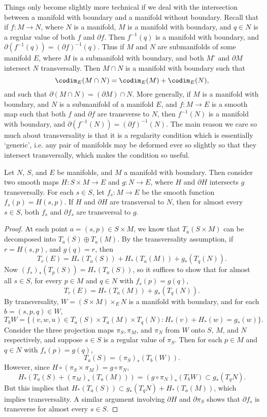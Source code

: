 Things only become slightly more technical if we deal with the intersection between a manifold with boundary and a manifold without boundary. Recall that if $f: M \to N$, where $N$ is a manifold, $M$ is a manifold with boundary, and $q \in N$ is a regular value of both $f$ and $\partial f$. Then $f^{-1}(q)$ is a manifold with boundary, and $\partial (f^{-1}(q)) = (\partial f)^{-1}(q)$. Thus if $M$ and $N$ are submanifolds of some manifold $E$, where $M$ is a submanifold with boundary, and both $M^\circ$ and $\partial M$ intersect $N$ transversally. Then $M \cap N$ is a manifold with boundary such that
%
\[ \codim_E(M \cap N) = \codim_E(M) + \codim_E(N), \]
%
and such that $\partial(M \cap N) = (\partial M) \cap N$. More generally, if $M$ is a manifold with boundary, and $N$ is a submanifold of a manifold $E$, and $f : M \to E$ is a smooth map such that both $f$ and $\partial f$ are transverse to $N$, then $f^{-1}(N)$ is a manifold with boundary, and $\partial (f^{-1}(N)) = (\partial f)^{-1}(N)$. The main reason we care so much about transversality is that it is a regularity condition which is essentially `generic', i.e. any pair of manifolds may be deformed ever so slightly so that they intersect transversally, which makes the condition so useful.

\begin{theorem}
    Let $N$, $S$, and $E$ be manifolds, and $M$ a manifold with boundary. Then consider two smooth maps $H: S \times M \to E$ and $g: N \to E$, where $H$ and $\partial H$ intersects $g$ transversally. For each $s \in S$, let $f_s: M \to E$ be the smooth function $f_s(p) = H(s,p)$. If $H$ and $\partial H$ are transversal to $N$, then for almost every $s \in S$, both $f_s$ and $\partial f_s$ are transversal to $g$.
\end{theorem}
\begin{proof}
    At each point $a = (s,p) \in S \times M$, we know that $T_a(S \times M)$ can be decomposed into $T_a(S) \oplus T_a(M)$. By the transversality assumption, if $r = H(s,p)$, and $g(q) = r$, then
    \[ T_r(E) = H_*(T_a(S)) + H_*(T_a(M)) + g_*(T_q(N)). \]
    Now $(f_s)_*(T_p(S)) = H_*(T_a(S))$, so it suffices to show that for almost all $s \in S$, for every $p \in M$ and $q \in N$ with $f_s(p) = g(q)$,
    \[ T_r(E) = H_*(T_a(M)) + g_*(T_q(N)). \]
    By transversality, $W = (S \times M) \times_E N$ is a manifold with boundary, and for each $b = (s,p,q) \in W$,
    \[ T_bW = \{ (v,w,u) \in T_a(S) \times T_a(M) \times T_q(N) : H_*(v) + H_*(w) = g_*(w) \}. \]
    Consider the three projection maps $\pi_S, \pi_M$, and $\pi_N$ from $W$ onto $S$, $M$, and $N$ respectively, and suppose $s \in S$ is a regular value of $\pi_S$. Then for each $p \in M$ and $q \in N$ with $f_s(p) = g(q)$,
    \[ T_a(S) = (\pi_S)_*(T_b(W)). \]
    However, since $H \circ (\pi_S \times \pi_M) = g \circ \pi_N$,
    \[ H_*(T_a(S) + (\pi_M)_*(T_a(M))) = (g \circ \pi_N)_*(T_b W) \subset g_*(T_q N). \]
    But this implies that $H_*(T_a(S)) \subset g_*(T_q N) + H_*(T_a(M))$, which implies transversality. A similar argument involving $\partial H$ and $\partial \pi_S$ shows that $\partial f_s$ is transverse for almost every $s \in S$.
\end{proof}


